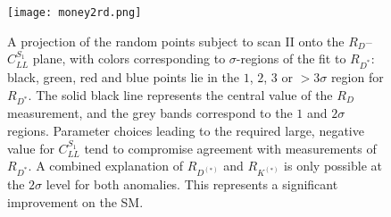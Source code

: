 \begin{figure}[t]
    \centering \texttt{[image: money2rd.png]}
    \caption[A projection of the random points subject to scan II onto the
      $R_D$--$C_{LL}^{S_{1}}$ plane, with colors corresponding to $\sigma$-regions
      of the fit to $R_{D^*}$: black, green, red and blue points lie in the $1$,
      $2$, $3$ or $>3\sigma$ region for $R_{D^*}$.]{A projection of the random points subject to scan II onto the
      $R_D$--$C_{LL}^{S_{1}}$ plane, with colors corresponding to $\sigma$-regions
      of the fit to $R_{D^*}$: black, green, red and blue points lie in the $1$,
      $2$, $3$ or $>3\sigma$ region for $R_{D^*}$. The solid black line
      represents the central value of the $R_D$ measurement, and the grey bands
      correspond to the $1$ and $2\sigma$ regions. Parameter choices leading to
      the required large, negative value for $C_{LL}^{S_{1}}$ tend to compromise
      agreement with measurements of $R_{D^*}$. A combined explanation of
      $R_{D^{(*)}}$ and $R_{K^{(*)}}$ is only possible at the $2\sigma$ level
      for both anomalies. This represents a significant improvement on the SM.}
  \label{fig:ch3-money}
\end{figure}
